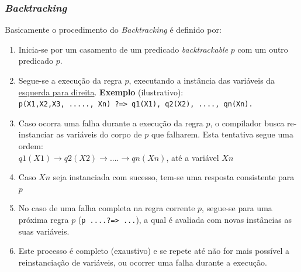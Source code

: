 \begin{frame}[allowframebreaks=0.7]
\frametitle{\textit{Backtracking}}

Basicamente o procedimento do \textit{Backtracking} é definido por:

\begin{enumerate}

\item Inicia-se por  um casamento de um predicado \textit{backtrackable} $p$ com um outro predicado $p$.

\item Segue-se a execução da regra $p$, executando a instância das variáveis da \underline{esquerda para direita}.
 \textbf{Exemplo} (ilustrativo):\\
      \texttt{p(X1,X2,X3, ....., Xn) ?=> q1(X1), q2(X2), ...., qn(Xn).} 

\item Caso ocorra uma falha durante a execução da regra $p$,
 o compilador busca re-instanciar as variáveis do corpo de $p$ que falharem. Esta tentativa segue uma ordem:\\ 
  $q1(X1) \rightarrow q2(X2)\rightarrow ....\rightarrow qn(Xn)$, até a variável $Xn$

\item Caso $Xn$ seja instanciada com sucesso, tem-se uma resposta consistente para $p$

\item No caso de uma falha completa na regra corrente $p$, segue-se para uma próxima regra $p$
 (\texttt{p ....?=> ...}), a qual  é avaliada com novas instâncias as suas  variáveis.

\item Este processo é completo (exaustivo) e se repete até não for mais possível a reinstanciação de variáveis, ou ocorrer uma falha  durante a   execução.
\end{enumerate}
\end{frame}


